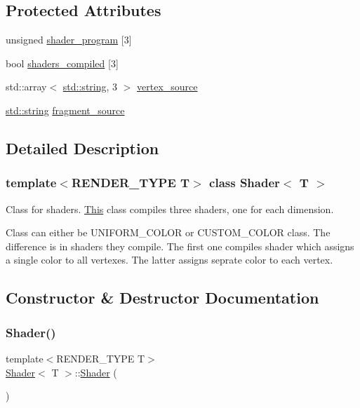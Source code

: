 \subsection*{Protected Attributes}
\begin{DoxyCompactItemize}
\item 
unsigned \mbox{\hyperlink{classShader_af8ec4edd2b1b56f32ce416280ff9b9e1}{shader\+\_\+program}} \mbox{[}3\mbox{]}
\item 
bool \mbox{\hyperlink{classShader_a057162ea090f838f7fbb658cb301efc4}{shaders\+\_\+compiled}} \mbox{[}3\mbox{]}
\item 
std\+::array$<$ \mbox{\hyperlink{glad_8h_ac83513893df92266f79a515488701770}{std\+::string}}, 3 $>$ \mbox{\hyperlink{classShader_a5b01f3b14e03a34da48da6906e9acc1f}{vertex\+\_\+source}}
\item 
\mbox{\hyperlink{glad_8h_ac83513893df92266f79a515488701770}{std\+::string}} \mbox{\hyperlink{classShader_afe4fa217dd3f5d201b6a5a4c7fd784be}{fragment\+\_\+source}}
\end{DoxyCompactItemize}


\subsection{Detailed Description}
\subsubsection*{template$<$R\+E\+N\+D\+E\+R\+\_\+\+T\+Y\+PE T$>$\newline
class Shader$<$ T $>$}

Class for shaders. \mbox{\hyperlink{classThis}{This}} class compiles three shaders, one for each dimension. 

Class can either be U\+N\+I\+F\+O\+R\+M\+\_\+\+C\+O\+L\+OR or C\+U\+S\+T\+O\+M\+\_\+\+C\+O\+L\+OR class. The difference is in shaders they compile. The first one compiles shader which assigns a single color to all vertexes. The latter assigns seprate color to each vertex. 

\subsection{Constructor \& Destructor Documentation}
\mbox{\label{classShader_a02faa1d7140779d7a24e06d1aff58d68}} 
\subsubsection{\texorpdfstring{Shader()}{Shader()}\hspace{0.1cm}{\footnotesize\ttfamily [1/4]}}
{\footnotesize\ttfamily template$<$R\+E\+N\+D\+E\+R\+\_\+\+T\+Y\+PE T$>$ \\
\mbox{\hyperlink{classShader}{Shader}}$<$ T $>$\+::\mbox{\hyperlink{classShader}{Shader}} (\begin{DoxyParamCaption}{ }\end{DoxyParamCaption})\hspace{0.3cm}{\ttfamily [inline]}}

